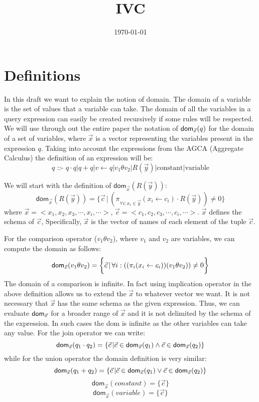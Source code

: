 \documentclass[12pt]{article}
\begin{document}
\title{IVC}
\author{}
\date{\today}
\maketitle
\newcommand{\dom}{\textsf{dom}}

\section{Definitions}
In this draft we want to explain the notion of domain. The domain of a variable is the set of values that a variable can take. The domain of all the variables in a query expression can easily be created recursively if some rules will be respected. We will use through out the entire paper the notation of $\text{\dom{}}_{\vec x}(q)$ for the domain of a set of variables, where $\vec x$ is a vector representing the variables present in the expression $q$. Taking into account the expressions from the AGCA (Aggregate Calculus\cite{1}) the definition of an expression will be: 
$$q\text{ ::- }q\cdot q | q + q|v \gets q |v_{1}\theta v_{2}|R(\vec{y})|\text{constant}|\text{variable}$$

We will start with the definition of $\dom{}_{\vec x}(R(\vec y))$:
$$\dom{}_{\vec x}(R(\vec y))=\bigg\{\vec c\,|\,(\pi_{\forall i:x_{i}\in \vec y}^{}(x_{i}\gets c_{i})\cdot R(\vec y))\not= 0\bigg\} $$where $\vec x=<x_1,x_2,x_3,\cdots,x_i,\cdots>$, $\vec c=<c_1,c_2,c_3,\cdots,c_i,\cdots>$.  $\vec{x}$ defines the schema of $\vec{c}$, Specifically, $\vec{x}$ is the vector of names of each element of the tuple $\vec{c}$. \par

For the comparison operator ($v_{1}\theta v_{2}$), where $v_1$ and $v_2$ are variables, we can compute the domain as follows:
\begin{equation*}
\text{\dom{}}_{\vec{x}}(v_{1}\theta v_{2})=\bigg\{\vec{c}\,|\,\forall i:((\pi_{i}(x_{i}\gets c_{i}))(v_{1}\theta v_{2}))\not= 0\bigg\}
\end{equation*}
The domain of a comparison is infinite. 
In fact using implication operator in the above definition allows us to extend the $\vec{x}$ to whatever vector we want. It is not necessary that $\vec{x}$  has the same schema as the given expression. Thus, we can evaluate $\text{\dom}_{\vec{x}}$ for a broader range of $\vec{x}$ and it is not delimited by the schema of the expression. In such cases the \dom{} is infinite as the other variables can take any value.
For the join operator we can write:
\begin{equation*}
\text{\dom{}}_{\vec{x}}(q_{1}\cdot q_{2})=\{\vec{c}\,|\vec{c}\in\text{\dom{}}_{\vec{x}}(q_{1})\land\vec{c}\in\text{\dom{}}_{\vec{x}}(q_{2})\}
\end{equation*}
while for the union operator the domain definition is very similar:
\begin{equation*}
\text{\dom{}}_{\vec{x}}(q_{1}+ q_{2})=\{\vec{c}\,|\vec{c}\in\text{\dom{}}_{\vec{x}}(q_{1})\lor\vec{c}\in\text{\dom{}}_{\vec{x}}(q_{2})\}
\end{equation*}
$$\dom{}_{\vec x}(constant)=\Big\{\vec c\Big\}$$
$$\dom{}_{\vec x}(variable)=\Big\{\vec c\Big\}$$
\end{document}
